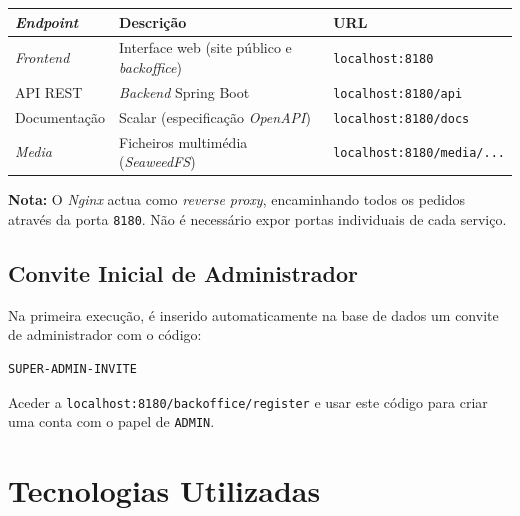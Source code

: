 \documentclass[12pt,a4paper]{article}
\begin{document}
\begin{center}
  \begin{tabularx}{0.85\textwidth}{@{}lXl@{}}
    \toprule
    \textbf{\textit{Endpoint}} & \textbf{Descrição}                                 & \textbf{URL}                      \\
    \midrule
    \textit{Frontend}          & Interface web (site público e \textit{backoffice}) & \texttt{localhost:8180}           \\
    API REST                   & \textit{Backend} Spring Boot                       & \texttt{localhost:8180/api}       \\
    Documentação               & Scalar (especificação \textit{OpenAPI})            & \texttt{localhost:8180/docs}      \\
    \textit{Media}             & Ficheiros multimédia (\textit{SeaweedFS})          & \texttt{localhost:8180/media/...} \\
    \bottomrule
  \end{tabularx}
\end{center}

\noindent\colorbox{codebg}{\parbox{\dimexpr\linewidth-2\fboxsep}{%
    \small\textbf{Nota:} O \textit{Nginx} actua como \textit{reverse proxy}, encaminhando todos os
    pedidos através da porta \texttt{8180}. Não é necessário expor portas individuais
    de cada serviço.
  }}

\subsection{Convite Inicial de Administrador}

Na primeira execução, é inserido automaticamente na base de dados um convite de administrador com o código:

\begin{lstlisting}
SUPER-ADMIN-INVITE
\end{lstlisting}

Aceder a \texttt{localhost:8180/backoffice/register} e
usar este código para criar uma conta com o papel de \texttt{ADMIN}.

\section{Tecnologias Utilizadas}
\end{document}
